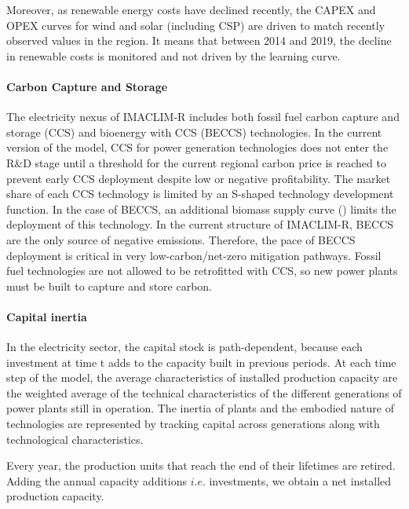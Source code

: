 {Moreover, as renewable energy costs have declined recently, the CAPEX and OPEX curves for wind and solar (including CSP) are driven to match recently observed values in the region. It means that between 2014 and 2019, the decline in renewable costs is monitored and not driven by the learning curve.


\paragraph{ Carbon Capture and Storage }
The electricity nexus of IMACLIM-R includes both fossil fuel carbon capture and storage (CCS) and bioenergy with CCS (BECCS) technologies. In the current version of the model, CCS for power generation technologies does not enter the R\&D stage until a threshold for the current regional carbon price is reached to prevent early CCS deployment despite low or negative profitability. The market share of each CCS technology is limited by an S-shaped technology development function. In the case of BECCS, an additional biomass supply curve (\cite{Hoogwijk2009}) limits the deployment of this technology. In the current structure of IMACLIM-R, BECCS are the only source of negative emissions. Therefore, the pace of BECCS deployment is critical in very low-carbon/net-zero mitigation pathways. Fossil fuel technologies are not allowed to be retrofitted with CCS, so new power plants must be built to capture and store carbon.


\paragraph{ Capital inertia }
In the electricity sector, the capital stock is path-dependent, because each investment at time t adds to the capacity built in previous periods. 
At each time step of the model, the average characteristics of installed production capacity are the weighted average of the technical characteristics of the different generations of power plants still in operation.
The inertia of plants and the embodied nature of technologies are represented by tracking capital across generations along with technological characteristics.


Every year, the production units that reach the end of their lifetimes are retired.
Adding the annual capacity additions $i.e.$ investments, we obtain a net installed production capacity.

}
